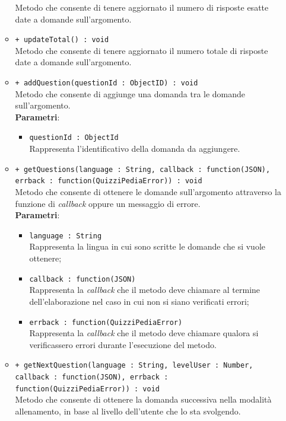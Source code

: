 \begin{itemize}
\begin{itemize}
			Metodo che consente di tenere aggiornato il numero di risposte esatte date a domande sull'argomento.
			\item \texttt{+ updateTotal() : void} \\
			Metodo che consente di tenere aggiornato il numero totale di risposte date a domande sull'argomento.
			\item \texttt{+ addQuestion(questionId : ObjectID) : void} \\
			Metodo che consente di aggiunge una domanda tra le domande sull'argomento. \\
			\textbf{Parametri}:
			\begin{itemize}
			\item \texttt{questionId : ObjectId} \\
			Rappresenta l'identificativo della domanda da aggiungere.
			\end{itemize}
			\item \texttt{+ getQuestions(language : String, callback : function(JSON), errback : function(QuizziPediaError)) : void} \\
			Metodo che consente di ottenere le domande sull'argomento attraverso la funzione di \textit{callback} oppure un messaggio di errore. \\
			\textbf{Parametri}:
			\begin{itemize}
			\item \texttt{language : String} \\
			Rappresenta la lingua in cui sono scritte le domande che si vuole ottenere;
			\item \texttt{callback : function(JSON)} \\
			Rappresenta la \textit{callback} che il metodo deve chiamare al termine dell'elaborazione nel caso in cui non si siano verificati errori;
			\item \texttt{errback : function(QuizziPediaError)} \\
			Rappresenta la \textit{callback} che il metodo deve chiamare qualora si verificassero errori durante l'esecuzione del metodo.
			\end{itemize}
			\item \texttt{+ getNextQuestion(language : String, levelUser : Number, callback : function(JSON), errback : function(QuizziPediaError)) : void} \\
			Metodo che consente di ottenere la domanda successiva nella modalità allenamento, in base al livello dell'utente che lo sta svolgendo. \\

\end{itemize}
\end{itemize}
